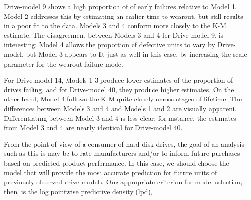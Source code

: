 \documentclass[aoas]{imsart}
\begin{document}
Drive-model 9 shows a high proportion of  of early failures relative to Model 1. Model 2 addresses this by estimating an earlier time to wearout, but still results in a poor fit to the data. Models 3 and 4 conform more closely to the K-M estimate. The disagreement between Models 3 and 4 for Drive-model 9, is interesting: Model 4 allows the proportion of defective units to vary by Drive-model, but Model 3 appears to fit just as well in this case, by increasing the scale parameter for the wearout failure mode.

For Drive-model 14, Models 1-3 produce lower estimates of the proportion of drives failing, and for Drive-model 40, they produce higher estimates.  On the other hand, Model 4 follows the K-M quite closely across stages of lifetime.  The differences between Models 3 and 4 and Models 1 and 2 are visually apparent.  Differentiating between Model 3 and 4 is less clear; for instance, the estimates from Model 3 and 4 are nearly identical for Drive-model 40.



From the point of view of a consumer of hard disk drives, the goal of an analysis such as this is may be to rate manufacturers and/or to inform future purchases based on predicted product performance. In this case, we should choose the model that will provide the most accurate prediction for future units of previously observed drive-models. One appropriate criterion for model selection, then, is the log pointwise predictive density (lpd),
\end{document}
